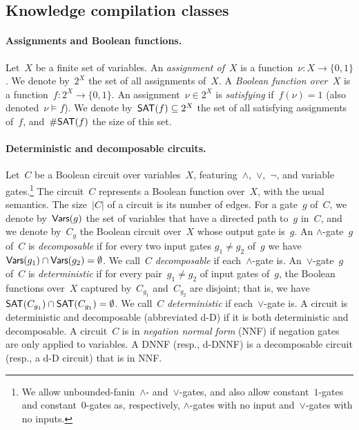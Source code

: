 \subsection{Knowledge compilation classes}
\label{subsec:KC}

\paragraph*{Assignments and Boolean functions.}
Let~$X$ be a finite set of variables.  An \emph{assignment of~$X$} is a
function~$\nu: X \to \{0,1\}$. We denote by~$2^X$ the set of all assignments
of~$X$.  A \emph{Boolean function over~$X$} is a function~$f:2^X\to \{0,1\}$.
An assignment~$\nu \in 2^X$ is \emph{satisfying} if~$f(\nu) =1$ (also
denoted~$\nu \models f$).  We denote by~$\mathsf{SAT}(f)\subseteq 2^X$ the set of all
satisfying assignments of~$f$, and~$\#\mathsf{SAT}(f)$ the size of this set.  

\paragraph*{Deterministic and decomposable circuits.}
Let~$C$ be a Boolean circuit over variables~$X$,
featuring~$\land$,~$\lor$,~$\lnot$, and variable gates.\footnote{We allow
unbounded-fanin~$\land$- and~$\lor$-gates, and also allow constant~$1$-gates
and constant~$0$-gates as, respectively, $\land$-gates with no input
and~$\lor$-gates with no inputs.} The circuit~$C$ represents a Boolean function
over~$X$, with the usual semantics.  The size~$|C|$ of a circuit is its number
of edges.  For a gate~$g$ of~$C$, we denote by~$\mathsf{Vars}(g)$ the set of variables
that have a directed path to~$g$ in~$C$, and we denote by~$C_g$ the Boolean
circuit over~$X$ whose output gate is~$g$.  An $\land$-gate~$g$ of~$C$ is
\emph{decomposable} if for every two input gates $g_1\neq g_2$ of~$g$ we
have~$\mathsf{Vars}(g_1) \cap \mathsf{Vars}(g_2) = \emptyset$.  We call~$C$ \emph{decomposable}
if each~$\land$-gate is.  An~$\lor$-gate~$g$ of~$C$ is \emph{deterministic} if
for every pair~$g_1\neq g_2$ of input gates of~$g$, the Boolean functions
over~$X$ captured by~$C_{g_1}$ and~$C_{g_2}$ are disjoint; that is, we
have~$\mathsf{SAT}(C_{g_1}) \cap \mathsf{SAT}(C_{g_1}) = \emptyset$.  We call~$C$
\emph{deterministic} if each~$\lor$-gate is.  A circuit is deterministic and
decomposable (abbreviated d-D) if it is both deterministic and decomposable.  A
circuit~$C$ is in \emph{negation normal form} (NNF) if negation gates are only
applied to variables.  A DNNF (resp., d-DNNF) is a decomposable circuit (resp.,
a d-D circuit) that is in NNF.

